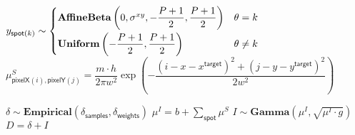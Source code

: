 \begin{algorithmic}[1]
            \State $ y_{\mathsf{spot}(k)} \sim
                \begin{cases}
                \mathbf{AffineBeta}\left( 0, \sigma^{xy}, -\dfrac{P+1}{2}, \dfrac{P+1}{2} \right) & \theta = k \\
                \mathbf{Uniform}\left(-\dfrac{P+1}{2}, \dfrac{P+1}{2} \right) & \theta \neq k \rule{0pt}{4ex} \end{cases} $
            \State $\mu^{S}_{\mathsf{pixelX}(i), \mathsf{pixelY}(j)} =
                        \dfrac{m \cdot h}{2 \pi w^2} \exp{\left ( -\dfrac{(i-x-x^\mathsf{target})^2 + (j-y-y^\mathsf{target})^2}{2w^2} \right)}$
            \EndFor
        \EndFor
            
            \State $\delta \sim \mathbf{Empirical}( \delta_\mathsf{samples}, \delta_\mathsf{weights})$
            \State $\mu^I = b + \sum_{\mathsf{spot}} \mu^S$
            \State $I \sim \mathbf{Gamma} (\mu^I, \sqrt{\mu^I \cdot g})$
            \State $D = \delta + I$
        \EndFor
    \EndFor
\EndFor
\end{algorithmic}